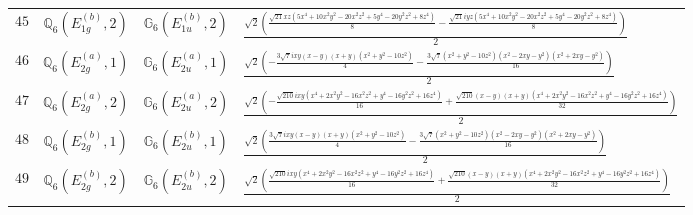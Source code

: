 \documentclass[fleqn,8pt,landscape]{jsarticle}
\begin{document}
\begin{table}[ht!]
\begin{center}
\begin{tabular}{cccl}
$ 45 $ & $ \mathbb{Q}_{6}(E_{1g}^{(b)},2) $ & $ \mathbb{G}_{6}(E_{1u}^{(b)},2) $ & $ \frac{\sqrt{2} \left(\frac{\sqrt{21} x z \left(5 x^{4} + 10 x^{2} y^{2} - 20 x^{2} z^{2} + 5 y^{4} - 20 y^{2} z^{2} + 8 z^{4}\right)}{8} - \frac{\sqrt{21} i y z \left(5 x^{4} + 10 x^{2} y^{2} - 20 x^{2} z^{2} + 5 y^{4} - 20 y^{2} z^{2} + 8 z^{4}\right)}{8}\right)}{2} $ \\
$ 46 $ & $ \mathbb{Q}_{6}(E_{2g}^{(a)},1) $ & $ \mathbb{G}_{6}(E_{2u}^{(a)},1) $ & $ \frac{\sqrt{2} \left(- \frac{3 \sqrt{7} i x y \left(x - y\right) \left(x + y\right) \left(x^{2} + y^{2} - 10 z^{2}\right)}{4} - \frac{3 \sqrt{7} \left(x^{2} + y^{2} - 10 z^{2}\right) \left(x^{2} - 2 x y - y^{2}\right) \left(x^{2} + 2 x y - y^{2}\right)}{16}\right)}{2} $ \\
$ 47 $ & $ \mathbb{Q}_{6}(E_{2g}^{(a)},2) $ & $ \mathbb{G}_{6}(E_{2u}^{(a)},2) $ & $ \frac{\sqrt{2} \left(- \frac{\sqrt{210} i x y \left(x^{4} + 2 x^{2} y^{2} - 16 x^{2} z^{2} + y^{4} - 16 y^{2} z^{2} + 16 z^{4}\right)}{16} + \frac{\sqrt{210} \left(x - y\right) \left(x + y\right) \left(x^{4} + 2 x^{2} y^{2} - 16 x^{2} z^{2} + y^{4} - 16 y^{2} z^{2} + 16 z^{4}\right)}{32}\right)}{2} $ \\
$ 48 $ & $ \mathbb{Q}_{6}(E_{2g}^{(b)},1) $ & $ \mathbb{G}_{6}(E_{2u}^{(b)},1) $ & $ \frac{\sqrt{2} \left(\frac{3 \sqrt{7} i x y \left(x - y\right) \left(x + y\right) \left(x^{2} + y^{2} - 10 z^{2}\right)}{4} - \frac{3 \sqrt{7} \left(x^{2} + y^{2} - 10 z^{2}\right) \left(x^{2} - 2 x y - y^{2}\right) \left(x^{2} + 2 x y - y^{2}\right)}{16}\right)}{2} $ \\
$ 49 $ & $ \mathbb{Q}_{6}(E_{2g}^{(b)},2) $ & $ \mathbb{G}_{6}(E_{2u}^{(b)},2) $ & $ \frac{\sqrt{2} \left(\frac{\sqrt{210} i x y \left(x^{4} + 2 x^{2} y^{2} - 16 x^{2} z^{2} + y^{4} - 16 y^{2} z^{2} + 16 z^{4}\right)}{16} + \frac{\sqrt{210} \left(x - y\right) \left(x + y\right) \left(x^{4} + 2 x^{2} y^{2} - 16 x^{2} z^{2} + y^{4} - 16 y^{2} z^{2} + 16 z^{4}\right)}{32}\right)}{2} $ \\
 \hline \hline
\end{tabular}
\end{center}
\end{table}
\end{document}
